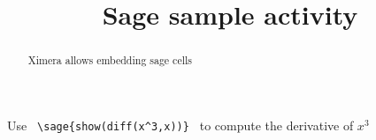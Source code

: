 \documentclass[handout]{ximera}
\title{Sage sample activity}
\begin{document}
\begin{abstract} Ximera allows embedding sage cells
\end{abstract}


\maketitle

Use \verb! \sage{show(diff(x^3,x))} ! to compute the derivative of \( x^3 \)

\end{document}
